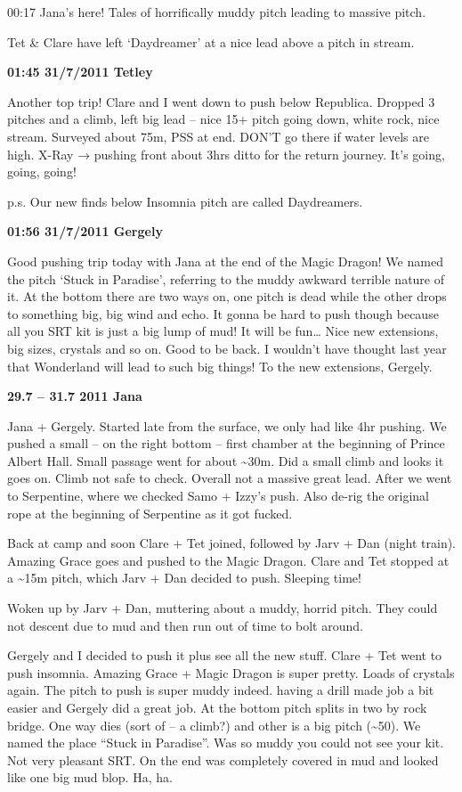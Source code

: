 00:17 Jana's here! Tales of horrifically muddy pitch leading to massive
pitch.

Tet \& Clare have left `Daydreamer' at a nice lead above a pitch in
stream.

\textbf{01:45 31/7/2011 Tetley}

Another top trip! Clare and I went down to push below Republica. Dropped
3 pitches and a climb, left big lead -- nice 15+ pitch going down, white
rock, nice stream. Surveyed about 75m, PSS at end. DON'T go there if
water levels are high. X-Ray → pushing front about 3hrs ditto for the
return journey. It's going, going, going!

p.s. Our new finds below Insomnia pitch are called Daydreamers.

\textbf{01:56 31/7/2011 Gergely}

Good pushing trip today with Jana at the end of the Magic Dragon! We
named the pitch `Stuck in Paradise', referring to the muddy awkward
terrible nature of it. At the bottom there are two ways on, one pitch is
dead while the other drops to something big, big wind and echo. It gonna
be hard to push though because all you SRT kit is just a big lump of
mud! It will be fun\ldots{} Nice new extensions, big sizes, crystals and
so on. Good to be back. I wouldn't have thought last year that
Wonderland will lead to such big things! To the new extensions, Gergely.

\textbf{29.7 -- 31.7 2011 Jana}

Jana + Gergely. Started late from the surface, we only had like 4hr
pushing. We pushed a small -- on the right bottom -- first chamber at
the beginning of Prince Albert Hall. Small passage went for about
\textasciitilde{}30m. Did a small climb and looks it goes on. Climb not
safe to check. Overall not a massive great lead. After we went to
Serpentine, where we checked Samo + Izzy's push. Also de-rig the
original rope at the beginning of Serpentine as it got fucked.

Back at camp and soon Clare + Tet joined, followed by Jarv + Dan (night
train). Amazing Grace goes and pushed to the Magic Dragon. Clare and Tet
stopped at a \textasciitilde{}15m pitch, which Jarv + Dan decided to
push. Sleeping time!

Woken up by Jarv + Dan, muttering about a muddy, horrid pitch. They
could not descent due to mud and then run out of time to bolt around.

Gergely and I decided to push it plus see all the new stuff. Clare + Tet
went to push insomnia. Amazing Grace + Magic Dragon is super pretty.
Loads of crystals again. The pitch to push is super muddy indeed. having
a drill made job a bit easier and Gergely did a great job. At the bottom
pitch splits in two by rock bridge. One way dies (sort of -- a climb?)
and other is a big pitch (\textasciitilde{}50). We named the place
``Stuck in Paradise''. Was so muddy you could not see your kit. Not very
pleasant SRT. On the end was completely covered in mud and looked like
one big mud blop. Ha, ha.

